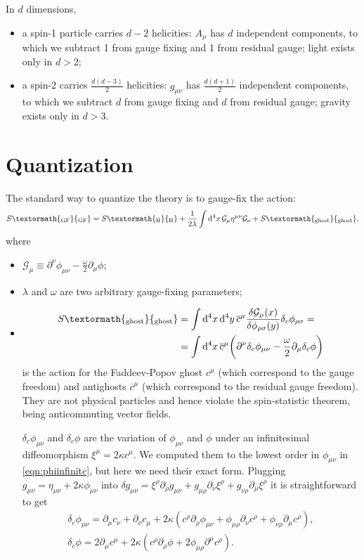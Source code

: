 \documentclass[a4paper,12pt]{book}
\newcommand{\ped}[1]{\textormath{\textsubscript{#1}}{_{\mathrm{#1}}}}
\newcommand{\dd}{\mathop{\mathrm{d}\!}{}}
\theoremstyle{definition}
\theoremstyle{remark}
\begin{document}
In $d$ dimensions,
\begin{itemize}
\item a spin-1 particle carries $d-2$ helicities: $A_\mu$ has $d$ independent components, to which we subtract 1 from gauge fixing and 1 from residual gauge; light exists only in $d>2$;
\item a spin-2 carries $\frac{d(d-3)}2$ helicities: $g_{\mu\nu}$ has $\frac{d(d+1)}2$ independent components, to which we subtract $d$ from gauge fixing and $d$ from residual gauge; gravity exists only in $d>3$.
\end{itemize}

\section{Quantization}
The standard way to quantize the theory is to gauge-fix the action:
\[S\ped{GF}=S\ped{H}+\frac1{2\lambda}\int\dd^4x\,\mathcal G_\mu\eta^{\mu\nu}\mathcal G_\nu+S\ped{ghost},\]
where
\begin{itemize}
\item $\mathcal G_\mu\equiv\partial^\nu\phi_{\mu\nu}-\frac\omega2\partial_\mu\phi$;
\item $\lambda$ and $\omega$ are two arbitrary gauge-fixing parameters;
\item \begin{align*}
S\ped{ghost}&=\int\dd^4x\dd^4y\,\overline c^\mu\frac{\delta\mathcal G_\mu(x)}{\delta\phi_{\rho\sigma}(y)}\delta_c\phi_{\rho\sigma}=\\
&=\int\dd^4x\,\overline c^\mu\biggl(\partial^\nu\delta_c\phi_{\mu\nu}-\frac\omega2\partial_\mu\delta_c\phi\biggr)%
\end{align*}is the action for the Faddeev-Popov ghost $c^\mu$ (which correspond to the gauge freedom) and antighosts $\overline c^\mu$ (which correspond to the residual gauge freedom). They are not physical particles and hence violate the spin-statistic theorem, being anticommuting vector fields.

$\delta_c\phi_{\mu\nu}$ and $\delta_c\phi$ are the variation of $\phi_{\mu\nu}$ and $\phi$ under an infinitesimal diffeomorphism $\xi^\mu=2\kappa c^\mu$. We computed them to the lowest order in $\phi_{\mu\nu}$ in \cref{eqn:phiinfinitc}, but here we need their exact form. Plugging $g_{\mu\nu}=\eta_{\mu\nu}+2\kappa\phi_{\mu\nu}$ into $\delta g_{\mu\nu}=\xi^\rho\partial_\rho g_{\mu\nu}+g_{\mu\rho}\partial_\nu\xi^\rho+g_{\nu\rho}\partial_\mu\xi^\rho$ it is straightforward to get
\begin{gather*}
\delta_c\phi_{\mu\nu}=\partial_\mu c_\nu+\partial_\nu c_\mu+2\kappa(c^\rho\partial_\rho\phi_{\mu\nu}+\phi_{\mu\rho}\partial_\nu c^\rho+\phi_{\nu\rho}\partial_\mu c^\rho),\\
\delta_c\phi=2\partial_\mu c^\mu+2\kappa(c^\rho\partial_\rho \phi+2\phi_{\mu\rho}\partial^\mu c^\rho).
\end{gather*}
\end{itemize}
\end{document}
